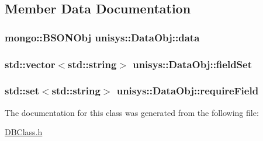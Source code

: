\subsection{Member Data Documentation}
\hypertarget{classunisys_1_1DataObj_a1c5410a047ff8cf88f810a6e3a1a7c29}{
\subsubsection[{data}]{\setlength{\rightskip}{0pt plus 5cm}mongo\-::\-B\-S\-O\-N\-Obj unisys\-::\-Data\-Obj\-::data\hspace{0.3cm}{\ttfamily [protected]}}}\label{classunisys_1_1DataObj_a1c5410a047ff8cf88f810a6e3a1a7c29}
\hypertarget{classunisys_1_1DataObj_a821fe7b1d5c081703b92bba388f8de6f}{
\subsubsection[{field\-Set}]{\setlength{\rightskip}{0pt plus 5cm}std\-::vector$<$std\-::string$>$ unisys\-::\-Data\-Obj\-::field\-Set\hspace{0.3cm}{\ttfamily [protected]}}}\label{classunisys_1_1DataObj_a821fe7b1d5c081703b92bba388f8de6f}
\hypertarget{classunisys_1_1DataObj_a0edcaa1c3d03422dca7171c32fcf1951}{
\subsubsection[{require\-Field}]{\setlength{\rightskip}{0pt plus 5cm}std\-::set$<$std\-::string$>$ unisys\-::\-Data\-Obj\-::require\-Field\hspace{0.3cm}{\ttfamily [protected]}}}\label{classunisys_1_1DataObj_a0edcaa1c3d03422dca7171c32fcf1951}


The documentation for this class was generated from the following file\-:\begin{DoxyCompactItemize}
\item 
\hyperlink{DBClass_8h}{D\-B\-Class.\-h}\end{DoxyCompactItemize}

